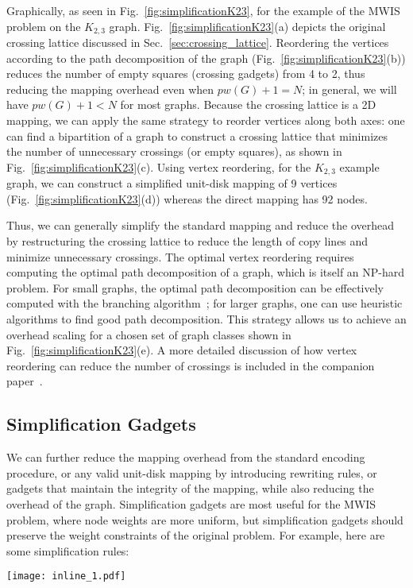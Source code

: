 Graphically, as seen in Fig.~\ref{fig:simplificationK23}, for the example of the MWIS problem on the $K_{2,3}$ graph.  Fig.~\ref{fig:simplificationK23}(a) depicts the original crossing lattice discussed in Sec.~\ref{sec:crossing_lattice}. Reordering the vertices according to the path decomposition of the graph (Fig.~\ref{fig:simplificationK23}(b)) reduces the number of empty squares (crossing gadgets) from 4 to 2, thus reducing the mapping overhead even when $pw(G) + 1 = N$; in general, we will have $pw(G) + 1 < N$ for most graphs. Because the crossing lattice is a 2D mapping, we can apply the same strategy to reorder vertices along both axes: one can find a bipartition of a graph to construct a crossing lattice that minimizes the number of unnecessary crossings (or empty squares), as shown in Fig.~\ref{fig:simplificationK23}(c). Using vertex reordering, for the $K_{2,3}$ example graph, we can construct a simplified unit-disk mapping of 9 vertices (Fig.~\ref{fig:simplificationK23}(d)) whereas the direct mapping has 92 nodes.

Thus, we can generally simplify the standard mapping and reduce the overhead by restructuring the crossing lattice to reduce the length of copy lines and minimize unnecessary crossings.  The optimal vertex reordering requires computing the optimal path decomposition of a graph, which is itself an NP-hard problem. For small graphs, the optimal path decomposition can be effectively computed with the branching algorithm~\cite{Coudert2014}; for larger graphs, one can use heuristic algorithms to find good path decomposition.   This strategy allows us to achieve an overhead scaling for a chosen set of graph classes shown in Fig.~\ref{fig:simplificationK23}(e). A more detailed discussion of how vertex reordering can reduce the number of crossings is included in the companion paper~\cite{unweightedpaper}.

\subsection{Simplification Gadgets}
We can further reduce the mapping overhead from the standard encoding procedure, or any valid unit-disk mapping by introducing rewriting rules, or gadgets that maintain the integrity of the mapping, while also reducing the overhead of the graph.  Simplification gadgets are most useful for the MWIS problem, where node weights are more uniform, but simplification gadgets should preserve the weight constraints of the original problem. For example, here are some simplification rules:
\begin{center}
\texttt{[image: inline\_1.pdf]}
\end{center}

